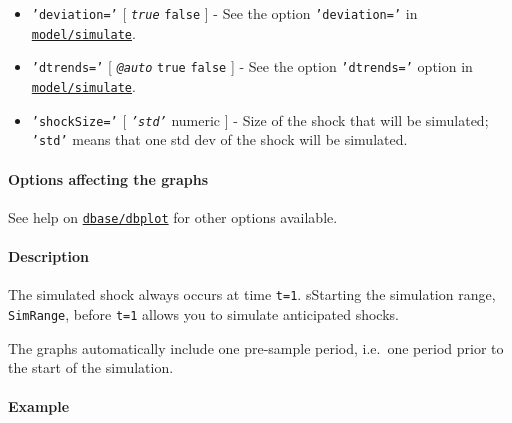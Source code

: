 \begin{itemize}
\item
  \texttt{'deviation='} {[} \emph{\texttt{true}} \textbar{}
  \texttt{false} {]} - See the option \texttt{'deviation='} in
  \href{model/simulate}{\texttt{model/simulate}}.
\item
  \texttt{'dtrends='} {[} \emph{\texttt{@auto}} \textbar{} \texttt{true}
  \textbar{} \texttt{false} {]} - See the option \texttt{'dtrends='}
  option in \href{model/simulate}{\texttt{model/simulate}}.
\item
  \texttt{'shockSize='} {[} \emph{\texttt{'std'}} \textbar{} numeric {]}
  - Size of the shock that will be simulated; \texttt{'std'} means that
  one std dev of the shock will be simulated.
\end{itemize}

\paragraph{Options affecting the
graphs}\label{options-affecting-the-graphs}

See help on \href{dbase/dbplot}{\texttt{dbase/dbplot}} for other options
available.

\paragraph{Description}\label{description}

The simulated shock always occurs at time \texttt{t=1}. sStarting the
simulation range, \texttt{SimRange}, before \texttt{t=1} allows you to
simulate anticipated shocks.

The graphs automatically include one pre-sample period, i.e.~one period
prior to the start of the simulation.

\paragraph{Example}\label{example}


